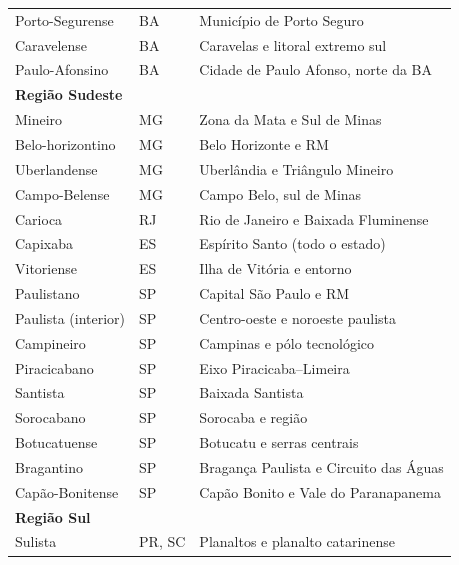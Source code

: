 \begin{table}[ht]
\begin{tabular}{lll}
Porto-Segurense & BA & Município de Porto Seguro               \\
Caravelense     & BA & Caravelas e litoral extremo sul         \\
Paulo-Afonsino  & BA & Cidade de Paulo Afonso, norte da BA     \\
\hline
\multicolumn{3}{l}{\textbf{Região Sudeste}} \\ \hline
Mineiro           & MG                     & Zona da Mata e Sul de Minas           \\
Belo-horizontino  & MG                     & Belo Horizonte e RM                   \\
Uberlandense      & MG                     & Uberlândia e Triângulo Mineiro        \\
Campo-Belense     & MG                     & Campo Belo, sul de Minas              \\
Carioca           & RJ                     & Rio de Janeiro e Baixada Fluminense   \\
Capixaba          & ES                     & Espírito Santo (todo o estado)        \\
Vitoriense        & ES                     & Ilha de Vitória e entorno             \\
Paulistano        & SP                     & Capital São Paulo e RM                \\
Paulista (interior)& SP                    & Centro-oeste e noroeste paulista      \\
Campineiro        & SP                     & Campinas e pólo tecnológico           \\
Piracicabano      & SP                     & Eixo Piracicaba–Limeira               \\
Santista          & SP                     & Baixada Santista                      \\
Sorocabano        & SP                     & Sorocaba e região                     \\
Botucatuense      & SP                     & Botucatu e serras centrais           \\
Bragantino        & SP                     & Bragança Paulista e Circuito das Águas\\
Capão-Bonitense   & SP                     & Capão Bonito e Vale do Paranapanema   \\
\hline
\multicolumn{3}{l}{\textbf{Região Sul}} \\ \hline
Sulista      & PR, SC                & Planaltos e planalto catarinense   \\

\end{tabular}
\end{table}
